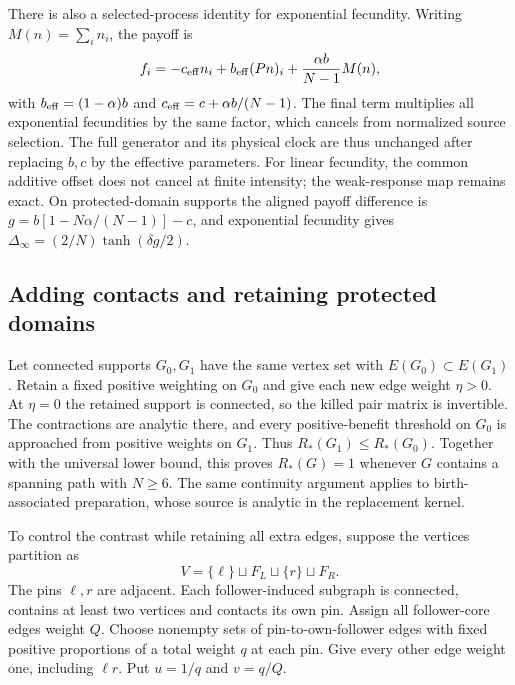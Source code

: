 \documentclass[aps,pre,reprint,amsmath,amssymb,longbibliography]{revtex4-2}
\begin{document}
There is also a selected-process identity for exponential fecundity.
Writing $M(n)=\sum_i n_i$, the payoff is
\begin{equation}
 f_i=-c_{\rm eff}n_i+b_{\rm eff}(Pn)_i
        +\frac{\alpha b}{N-1}M(n),
 \label{eq:v7-encounter-effective-payoff}
\end{equation}
with $b_{\rm eff}=(1-\alpha)b$ and
$c_{\rm eff}=c+\alpha b/(N-1)$. The final term multiplies all
exponential fecundities by the same factor, which cancels from
normalized source selection. The full generator and its physical
clock are thus unchanged after replacing $b,c$ by the effective
parameters. For linear fecundity, the common additive offset
does not cancel at finite intensity; the weak-response map remains
exact. On protected-domain supports the aligned payoff difference
is $g=b[1-N\alpha/(N-1)]-c$, and exponential fecundity gives
$\Delta_\infty=(2/N)\tanh(\delta g/2)$.

\subsection{Adding contacts and retaining protected domains}
\label{app:v7-support-extension}
Let connected supports $G_0,G_1$ have the same vertex set with
$E(G_0)\subset E(G_1)$. Retain a fixed positive weighting on
$G_0$ and give each new edge weight $\eta>0$. At $\eta=0$ the
retained support is connected, so the killed pair matrix is
invertible. The contractions are analytic there, and every
positive-benefit threshold on $G_0$ is approached from positive
weights on $G_1$. Thus $R_*(G_1)\le R_*(G_0)$.
Together with the universal lower bound, this proves
$R_*(G)=1$ whenever $G$ contains a spanning path with $N\ge6$.
The same continuity argument applies to birth-associated
preparation, whose source is analytic in the replacement kernel.

To control the contrast while retaining all extra edges, suppose
the vertices partition as
\begin{equation}
 V=\{\ell\}\sqcup F_L\sqcup\{r\}\sqcup F_R.
 \label{eq:v7-two-core-partition}
\end{equation}
The pins $\ell,r$ are adjacent. Each follower-induced subgraph is
connected, contains at least two vertices and contacts its own pin.
Assign all follower-core edges weight $Q$. Choose nonempty sets of
pin-to-own-follower edges with fixed positive proportions of a total
weight $q$ at each pin. Give every other edge weight one, including
$\ell r$. Put $u=1/q$ and $v=q/Q$.
\end{document}
